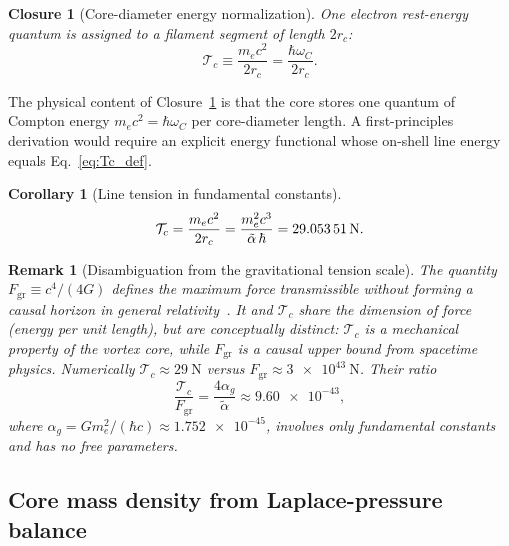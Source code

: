 \documentclass[aps,pra,preprint,longbibliography,nofootinbib]{revtex4-2}
\newtheorem{corollary}{Corollary}
\newtheorem{remark}{Remark}
\newtheorem{closure}{Closure}
\newcommand{\rc}{r_c}                            %
\newcommand{\omC}{\omega_C}                      %
\newcommand{\Tc}{\mathcal{T}_c}                  %
\newcommand{\Fgr}{F_{\mathrm{gr}}}              %
\begin{document}
\begin{closure}[Core-diameter energy normalization]
\label{cl:tension}
One electron rest-energy quantum is assigned to a filament segment of
length $2\rc$:
\begin{equation}
  \Tc \equiv \frac{m_e c^2}{2\rc} = \frac{\hbar\omC}{2\rc}.
  \label{eq:Tc_def}
\end{equation}
\end{closure}

The physical content of Closure~\ref{cl:tension} is that the core stores
one quantum of Compton energy $m_e c^2=\hbar\omega_C$ per core-diameter
length.  A first-principles derivation would require an explicit
energy functional whose on-shell line energy equals Eq.~\eqref{eq:Tc_def}.

\begin{corollary}[Line tension in fundamental constants]
\label{cor:Tc}
\begin{equation}
  \Tc = \frac{m_e c^2}{2\rc}
      = \frac{m_e^2 c^3}{\tilde\alpha\,\hbar}
      = \SI{29.053\,51}{\newton}.
  \label{eq:Tc}
\end{equation}
\end{corollary}

\begin{remark}[Disambiguation from the gravitational tension scale]
\label{rem:Fgr}
The quantity $\Fgr \equiv c^4/(4G)$ defines the maximum force
transmissible without forming a causal horizon in general
relativity~\cite{Gibbons2002,Schiller2006}.
It and $\Tc$ share the dimension of force (energy per unit length),
but are conceptually distinct:
$\Tc$ is a mechanical property of the vortex core, while $\Fgr$ is
a causal upper bound from spacetime physics.
Numerically $\Tc \approx \SI{29}{\newton}$ versus
$\Fgr \approx \SI{3e43}{\newton}$.
Their ratio
\begin{equation}
  \frac{\Tc}{\Fgr} = \frac{4\alpha_g}{\tilde\alpha}
                   \approx \num{9.60e-43},
  \label{eq:tension_ratio}
\end{equation}
where $\alpha_g = Gm_e^2/(\hbar c) \approx \num{1.752e-45}$,
involves only fundamental constants and has no free parameters.
\end{remark}

\subsection{Core mass density from Laplace-pressure balance}
\label{sec:rhocore}
\end{document}
